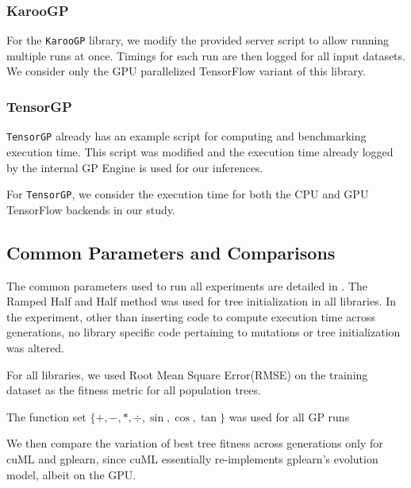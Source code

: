 \subsubsection{KarooGP}
For the \texttt{KarooGP} library, we modify the provided server script to allow running multiple runs at once. Timings for each run are then logged for all input datasets. We consider only the GPU parallelized TensorFlow variant of this library.

\subsubsection{TensorGP}
\texttt{TensorGP} already has an example script for computing and benchmarking execution time. This script was modified and the execution time already logged by the internal GP Engine is used for our inferences.

For \texttt{TensorGP}, we consider the execution time for both the CPU and GPU TensorFlow backends in our study.

\subsection{Common Parameters and Comparisons}
\label{subsec:commparams}
 
The common parameters used to run all experiments are detailed in . The Ramped Half and Half method was used for tree initialization in all libraries. In the experiment, other than inserting code to compute execution time across generations, no library specific code pertaining to mutations or tree initialization was altered.

For all libraries, we used Root Mean Square Error(RMSE) on the training dataset as the fitness metric for all population trees. 

The function set $\{+,-,*,\div,\sin ,\cos,\tan\}$ was used for all GP runs 

We then compare the variation of best tree fitness across generations only for cuML and gplearn, since cuML essentially re-implements gplearn's evolution model, albeit on the GPU. 

